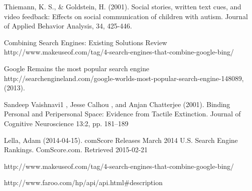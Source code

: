 \documentclass[11pt]{article}
\begin{document}
\begin{thebibliography}{100}
Thiemann, K. S., \& Goldstein, H. (2001). Social stories, written text cues, and video feedback: Effects on social communication of children with autism. Journal of Applied Behavior Analysis, 34, 425-446.


Combining Search Engines: Existing Solutions Review
http://www.makeuseof.com/tag/4-search-engines-that-combine-google-bing/


Google Remains the most popular search engine http://searchengineland.com/google-worlds-most-popular-search-engine-148089, (2013).  


Sandeep Vaishnavi1 , Jesse Calhou , and Anjan Chatterjee (2001). Binding Personal and Peripersonal Space: Evidence from Tactile Extinction. Journal of Cognitive Neuroscience 13:2, pp. 181–189


Lella, Adam (2014-04-15). comScore Releases March 2014 U.S. Search Engine Rankings. ComScore.com. Retrieved 2015-02-21



 http://www.makeuseof.com/tag/4-search-engines-that-combine-google-bing/


http://www.faroo.com/hp/api/api.html\#description

\end{thebibliography}
\end{document}
